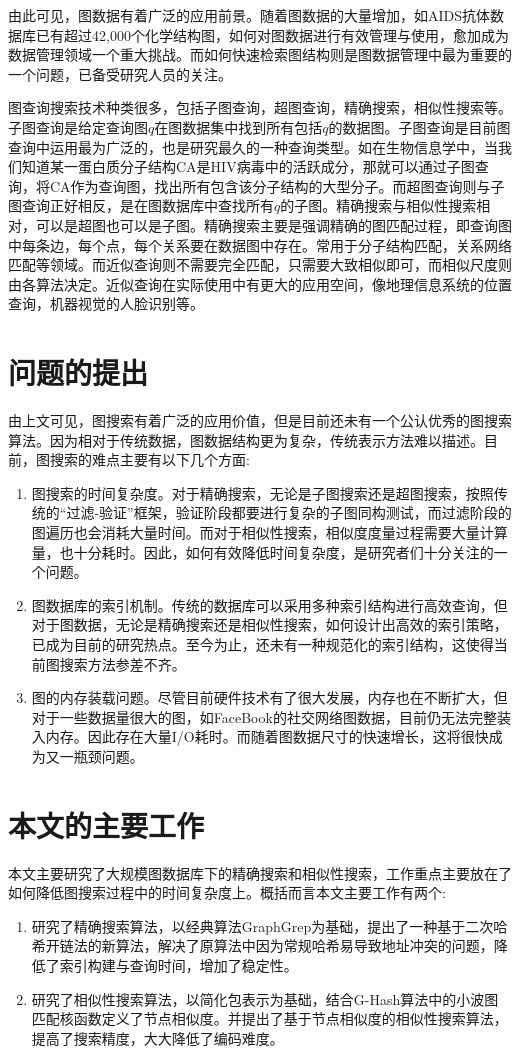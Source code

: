 \documentclass{XDBAthesis}
\begin{document}
由此可见，图数据有着广泛的应用前景。随着图数据的大量增加，如AIDS抗体数据库已有超过42,000个化学结构图，如何对图数据进行有效管理与使用，愈加成为数据管理领域一个重大挑战。而如何快速检索图结构则是图数据管理中最为重要的一个问题，已备受研究人员的关注。

图查询搜索技术种类很多，包括子图查询，超图查询，精确搜索，相似性搜索等\cite{g13}。子图查询是给定查询图$q$在图数据集中找到所有包括$q$的数据图。子图查询是目前图查询中运用最为广泛的，也是研究最久的一种查询类型。如在生物信息学中\cite{g13}，当我们知道某一蛋白质分子结构CA是HIV病毒中的活跃成分，那就可以通过子图查询，将CA作为查询图，找出所有包含该分子结构的大型分子。而超图查询则与子图查询正好相反，是在图数据库中查找所有$q$的子图。精确搜索与相似性搜索相对，可以是超图也可以是子图。精确搜索主要是强调精确的图匹配过程，即查询图中每条边，每个点，每个关系要在数据图中存在。常用于分子结构匹配，关系网络匹配等领域。而近似查询则不需要完全匹配，只需要大致相似即可，而相似尺度则由各算法决定。近似查询在实际使用中有更大的应用空间，像地理信息系统的位置查询，机器视觉的人脸识别等\cite{g13}。
\section{问题的提出}
由上文可见，图搜索有着广泛的应用价值，但是目前还未有一个公认优秀的图搜索算法。因为相对于传统数据，图数据结构更为复杂，传统表示方法难以描述。目前，图搜索的难点主要有以下几个方面:
\begin{enumerate}
    \item 图搜索的时间复杂度。对于精确搜索，无论是子图搜索还是超图搜索，按照传统的“过滤-验证”框架，验证阶段都要进行复杂的子图同构测试，而过滤阶段的图遍历也会消耗大量时间。而对于相似性搜索，相似度度量过程需要大量计算量，也十分耗时。因此，如何有效降低时间复杂度，是研究者们十分关注的一个问题。
    \item 图数据库的索引机制。传统的数据库可以采用多种索引结构进行高效查询，但对于图数据，无论是精确搜索还是相似性搜索，如何设计出高效的索引策略，已成为目前的研究热点。至今为止，还未有一种规范化的索引结构，这使得当前图搜索方法参差不齐。
    \item 图的内存装载问题。尽管目前硬件技术有了很大发展，内存也在不断扩大，但对于一些数据量很大的图，如FaceBook的社交网络图数据，目前仍无法完整装入内存。因此存在大量I/O耗时。而随着图数据尺寸的快速增长，这将很快成为又一瓶颈问题。
\end{enumerate}

\section{本文的主要工作}
本文主要研究了大规模图数据库下的精确搜索和相似性搜索，工作重点主要放在了如何降低图搜索过程中的时间复杂度上。概括而言本文主要工作有两个:
\begin{enumerate}
    \item 研究了精确搜索算法，以经典算法GraphGrep\cite{graphgrep}为基础，提出了一种基于二次哈希开链法的新算法，解决了原算法中因为常规哈希易导致地址冲突的问题，降低了索引构建与查询时间，增加了稳定性。
    \item 研究了相似性搜索算法，以简化包表示为基础，结合G-Hash\cite{ghash}算法中的小波图匹配核函数定义了节点相似度。并提出了基于节点相似度的相似性搜索算法，提高了搜索精度，大大降低了编码难度。
\end{enumerate}
\end{document}
